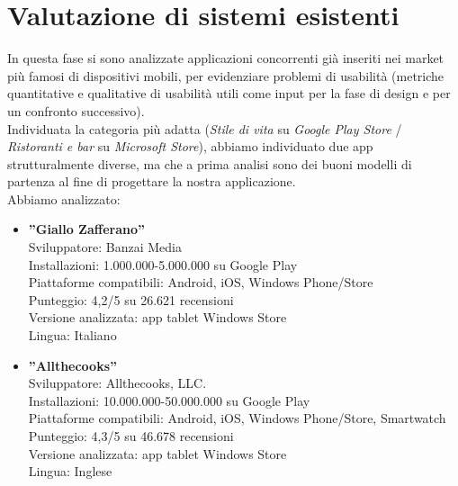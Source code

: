 \section{Valutazione di sistemi esistenti}

In questa fase si sono analizzate applicazioni concorrenti già inseriti nei market più famosi di dispositivi mobili, per evidenziare problemi di usabilità (metriche quantitative e qualitative di usabilità utili come input per la fase di design e per un confronto successivo).\\
Individuata la categoria più adatta (\textit{Stile di vita} su \textit{Google Play Store} / \textit{Ristoranti e bar} su \textit{Microsoft Store}), abbiamo individuato due app strutturalmente
diverse, ma che a prima analisi sono dei buoni modelli di partenza al fine di progettare la nostra applicazione.\\
Abbiamo analizzato:
\begin{itemize}
\item \textbf{”Giallo Zafferano”}\\
Sviluppatore: Banzai Media\\
Installazioni: 1.000.000-5.000.000 su Google Play\\
Piattaforme compatibili: Android, iOS, Windows Phone/Store\\
Punteggio: 4,2/5 su 26.621 recensioni\\
Versione analizzata: app tablet Windows Store\\
Lingua: Italiano\\
\item \textbf{”Allthecooks”}\\
Sviluppatore: Allthecooks, LLC.\\
Installazioni: 10.000.000-50.000.000 su Google Play\\
Piattaforme compatibili: Android, iOS, Windows Phone/Store, Smartwatch\\
Punteggio: 4,3/5 su 46.678 recensioni\\
Versione analizzata: app tablet Windows Store\\
Lingua: Inglese\\
\end{itemize} 

